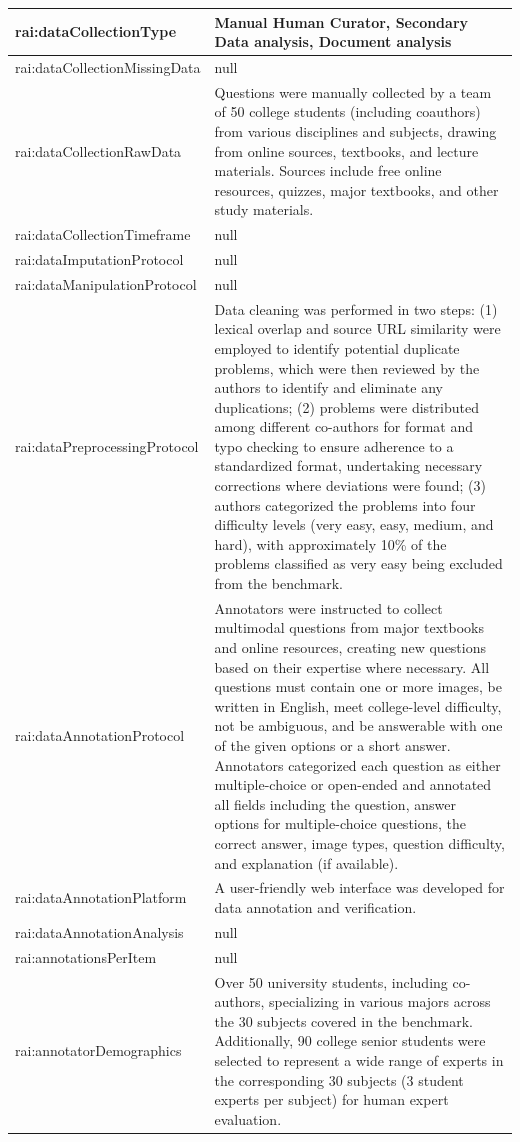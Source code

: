 \documentclass[10pt,a4paper]{article}
\begin{document}
\begin{longtable}{|p{4cm}|p{12cm}|}
\hline
rai:dataCollectionType & Manual Human Curator, Secondary Data analysis, Document analysis \\
\hline
rai:dataCollectionMissingData & null \\
\hline
rai:dataCollectionRawData & Questions were manually collected by a team of 50 college students (including coauthors) from various disciplines and subjects, drawing from online sources, textbooks, and lecture materials. Sources include free online resources, quizzes, major textbooks, and other study materials. \\
\hline
rai:dataCollectionTimeframe & null \\
\hline
rai:dataImputationProtocol & null \\
\hline
rai:dataManipulationProtocol & null \\
\hline
rai:dataPreprocessingProtocol & Data cleaning was performed in two steps: (1) lexical overlap and source URL similarity were employed to identify potential duplicate problems, which were then reviewed by the authors to identify and eliminate any duplications; (2) problems were distributed among different co-authors for format and typo checking to ensure adherence to a standardized format, undertaking necessary corrections where deviations were found; (3) authors categorized the problems into four difficulty levels (very easy, easy, medium, and hard), with approximately 10\% of the problems classified as very easy being excluded from the benchmark. \\
\hline
rai:dataAnnotationProtocol & Annotators were instructed to collect multimodal questions from major textbooks and online resources, creating new questions based on their expertise where necessary. All questions must contain one or more images, be written in English, meet college-level difficulty, not be ambiguous, and be answerable with one of the given options or a short answer. Annotators categorized each question as either multiple-choice or open-ended and annotated all fields including the question, answer options for multiple-choice questions, the correct answer, image types, question difficulty, and explanation (if available). \\
\hline
rai:dataAnnotationPlatform & A user-friendly web interface was developed for data annotation and verification. \\
\hline
rai:dataAnnotationAnalysis & null \\
\hline
rai:annotationsPerItem & null \\
\hline
rai:annotatorDemographics & Over 50 university students, including co-authors, specializing in various majors across the 30 subjects covered in the benchmark. Additionally, 90 college senior students were selected to represent a wide range of experts in the corresponding 30 subjects (3 student experts per subject) for human expert evaluation. \\

\end{longtable}
\end{document}
